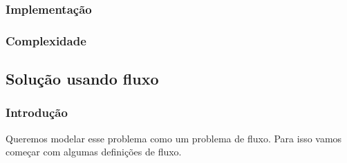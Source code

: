 \documentclass[11pt]{article}
\begin{document}
\subsubsection{Implementação}
\label{sec-3-2-2}

\subsubsection{Complexidade}
\label{sec-3-2-3}
\subsection{Solução usando fluxo}
\label{sec-3-3}

\subsubsection{Introdução}
\label{sec-3-3-1}

Queremos modelar esse problema como um problema de fluxo. Para isso
vamos começar com algumas definições de fluxo.
\end{document}
